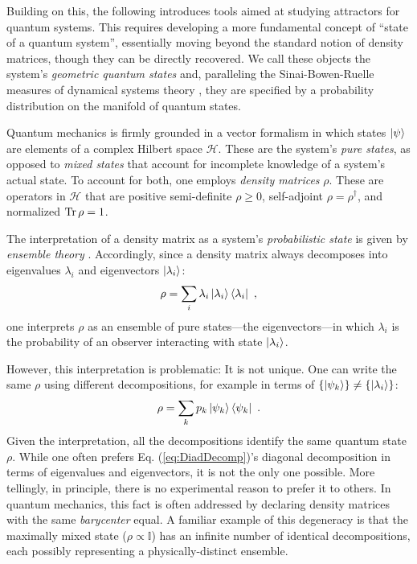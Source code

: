 \documentclass[nofootinbib,pre,twocolumn,showpacs,showkeys,groupaddress,preprintnumbers,floatfix]{revtex4-1}
\newcommand{\1}{\mathbbm{1}}
\begin{document}
Building on this, the following introduces tools aimed at studying attractors
for quantum systems. This requires developing a more fundamental concept of
``state of a quantum system'', essentially moving beyond the standard notion of
density matrices, though they can be directly recovered. We call these objects
the system's \emph{geometric quantum states} and, paralleling the
Sinai-Bowen-Ruelle measures of dynamical systems theory \cite{Eckmann1985},
they are specified by a probability distribution on the manifold of quantum
states.

Quantum mechanics is firmly grounded in a vector formalism in which states
$\ket{\psi}$ are elements of a complex Hilbert space $\mathcal{H}$. These are
the system's \emph{pure states}, as opposed to \emph{mixed states} that account
for incomplete knowledge of a system's actual state. To account for both, one
employs \emph{density matrices} $\rho$. These are operators in $\mathcal{H}$
that are positive semi-definite $\rho \geq 0$, self-adjoint $\rho
=\rho^\dagger$, and normalized $\Tr \rho = 1$.

The interpretation of a density matrix as a system's \emph{probabilistic state}
is given by \emph{ensemble theory} \cite{Pathria2011,Greiner1995}. Accordingly,
since a density matrix always decomposes into eigenvalues $\lambda_i$ and
eigenvectors $\ket{\lambda_i}$:
\begin{align}
\rho = \sum_i \lambda_i \ket{\lambda_i}\bra{\lambda_i}
  ~,
\label{eq:DiadDecomp}
\end{align}
one interprets $\rho$ as an ensemble of pure states---the eigenvectors---in
which $\lambda_i$ is the probability of an observer interacting with
state $\ket{\lambda_i}$.

However, this interpretation is problematic: It is not unique. One can write
the same $\rho$ using different decompositions, for example in terms of
$\{ \ket{\psi_k}\} \neq \{\ket{\lambda_i}\}$:
\begin{align*}
\rho = \sum_k p_k \ket{\psi_k}\bra{\psi_k}
  ~.
\end{align*}
Given the interpretation, all the decompositions identify the same quantum
state $\rho$. While one often prefers Eq. (\ref{eq:DiadDecomp})'s diagonal
decomposition in terms of eigenvalues and eigenvectors, it is not the only one
possible. More tellingly, in principle, there is no experimental reason to
prefer it to others. In quantum mechanics, this fact is often addressed by
declaring density matrices with the same \emph{barycenter} equal. A familiar
example of this degeneracy is that the maximally mixed state ($\rho \propto
\mathbb{I}$) has an infinite number of identical decompositions, each possibly
representing a physically-distinct ensemble.
\end{document}
